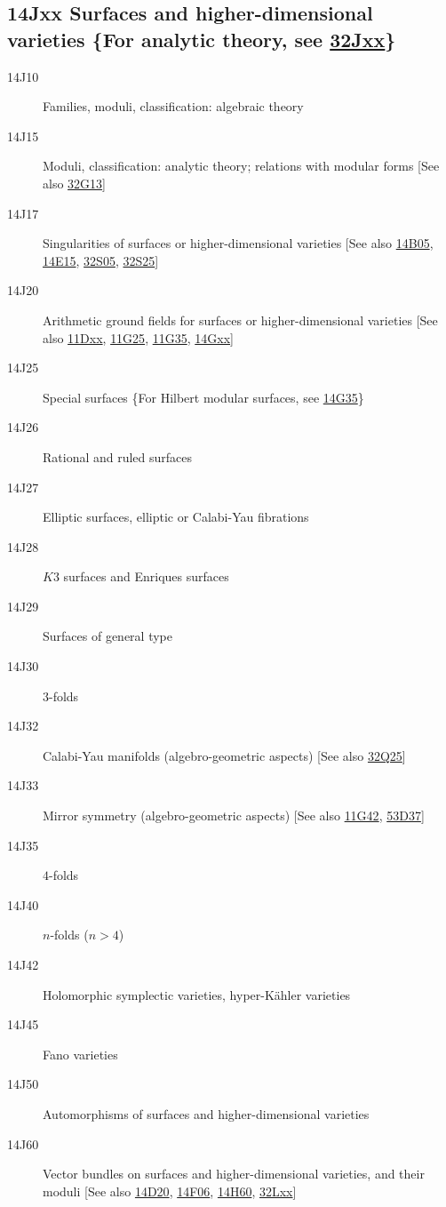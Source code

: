 \subsection*{14Jxx Surfaces and higher-dimensional varieties \{For analytic theory, see \hyperref[32Jxx]{32Jxx}\} }\label{14Jxx}
\begin{description}               
\item [14J10]\label{14J10} Families, moduli, classification: algebraic theory
\item [14J15]\label{14J15} Moduli, classification: analytic theory; relations with modular forms [See also \hyperref[32G13]{32G13}]
\item [14J17]\label{14J17} Singularities of surfaces or higher-dimensional varieties [See also \hyperref[14B05]{14B05}, \hyperref[14E15]{14E15}, \hyperref[32S05]{32S05}, \hyperref[32S25]{32S25}]
\item [14J20]\label{14J20} Arithmetic ground fields for surfaces or higher-dimensional varieties [See also \hyperref[11Dxx]{11Dxx}, \hyperref[11G25]{11G25}, \hyperref[11G35]{11G35}, \hyperref[14Gxx]{14Gxx}]
\item [14J25]\label{14J25} Special surfaces \{For Hilbert modular surfaces, see \hyperref[14G35]{14G35}\}
\item [14J26]\label{14J26} Rational and ruled surfaces
\item [14J27]\label{14J27} Elliptic surfaces, elliptic or Calabi-Yau fibrations
\item [14J28]\label{14J28} $K3$ surfaces and Enriques surfaces
\item [14J29]\label{14J29} Surfaces of general type
\item [14J30]\label{14J30} $3$-folds
\item [14J32]\label{14J32} Calabi-Yau manifolds (algebro-geometric aspects) [See also \hyperref[32Q25]{32Q25}]
\item [14J33]\label{14J33} Mirror symmetry (algebro-geometric aspects) [See also \hyperref[11G42]{11G42}, \hyperref[53D37]{53D37}]
\item [14J35]\label{14J35} $4$-folds
\item [14J40]\label{14J40} $n$-folds ($n>4$)
\item [14J42]\label{14J42} Holomorphic symplectic varieties, hyper-K\"{a}hler varieties
\item [14J45]\label{14J45} Fano varieties
\item [14J50]\label{14J50} Automorphisms of surfaces and higher-dimensional varieties
\item [14J60]\label{14J60} Vector bundles on surfaces and higher-dimensional varieties, and their moduli [See also \hyperref[14D20]{14D20}, \hyperref[14F06]{14F06}, \hyperref[14H60]{14H60}, \hyperref[32Lxx]{32Lxx}]

\end{description}
